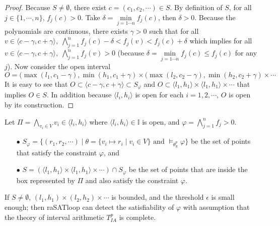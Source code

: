 \begin{proof}
\sloppy
Because $S \neq \emptyset$, there exist $c = (c_1, c_2, \cdots) \in S$. By definition of $S$, for all ${j \in \{1, \cdots, n\}, \, f_j(c) > 0}$. Take $\delta = \min\limits_{j=1\cdots n} f_j(c)$, then $\delta > 0$. Because the polynomials are continuous, there exists $\gamma > 0$ such that for all $v \in \langle c - \gamma, {c + \gamma \rangle, \; \bigwedge\limits_{j=1}^n f_j(c) - \delta < f_j(v) < f_j(c) + \delta}$ which implies for all ${v \in \langle c - \gamma, c + \gamma \rangle, \; \bigwedge\limits_{j=1}^n f_j(v) > 0}$ (because $\delta = \min\limits_{j=1\cdots n}f_j(c) \le f_j(c)$ for any $j$).
Now consider the open interval \[O = (\max(l_1, c_1 -\gamma), \min(h_1, c_1 + \gamma) \times (\max(l_2, c_2 -\gamma), \min(h_2, c_2 + \gamma) \times \cdots\]
It is easy to see that $O \subset \langle c - \gamma, c + \gamma \rangle \subset S_\varphi$ and ${O \subset \langle l_1, h_1 \rangle \times \langle l_1, h_1 \rangle \times \cdots}$ that implies $O \in S$. In addition because $\langle l_i, h_i \rangle$ is open for each $i=1,2,\cdots$, $O$ is open by its construction.
\end{proof}

\begin{theorem} \label{theorem:SAT-complete}
Let $\Pi = \bigwedge\limits_{v_i \in V} v_i \in \langle l_i, h_i \rangle$ where $\langle l_i, h_i \rangle \in \mathbb{I}$ is open, and ${\varphi = \bigwedge\limits_{j = 1}^n f_j > 0}$. \begin{itemize}
\item [$\bullet$] $S_\varphi = \{(r_1, r_2, \cdots) \mid \theta = \{v_i \mapsto r_i \mid v_i \in V \} \text{ and } \models_{\theta^p_\mathbb{R}}\varphi \}$ be the set of points that satisfy the constraint $\varphi$, and
\item [$\bullet$] $S = (\langle l_1, h_1 \rangle \times \langle l_1, h_1 \rangle \times \cdots) \cap S_\varphi$ be the set of points that are inside the box represented by $\Pi$ and also satisfy the constraint $\varphi$.
\end{itemize}


If $S \neq \emptyset$, $(l_1, h_1) \times (l_2, h_2) \times \cdots$ is bounded, and the threshold $\epsilon$ is small enough; then raSATloop can detect the satisfiability of $\varphi$ with assumption that the theory of interval arithmetic $T^p_{IA}$ is complete.
\end{theorem}


